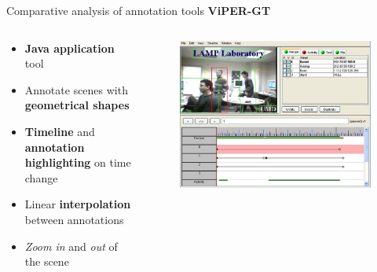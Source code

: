 \documentclass{beamer}
\begin{document}
\begin{tframe}{Comparative analysis of annotation tools}
\textbf{ViPER-GT} 
\begin{columns}[t] %
\begin{column}{.5\textwidth}
\begin{itemize}
\item \textbf{Java application} tool
\vspace{0.2cm}
\item Annotate scenes with \textbf{geometrical shapes}
\vspace{0.2cm}
\item \textbf{Timeline} and \textbf{annotation highlighting} on time change
\vspace{0.2cm}
\item Linear \textbf{interpolation} between annotations
\vspace{0.2cm}
\item \emph{Zoom in} and \emph{out} of the scene
\end{itemize}
\end{column}%
\begin{column}{.3\textwidth}
\begin{figure}[h]
\centering
\includegraphics[scale=0.15]{images/vipergt.jpg}
\end{figure}
\end{column}%
\end{columns}
\end{tframe}
\end{document}
